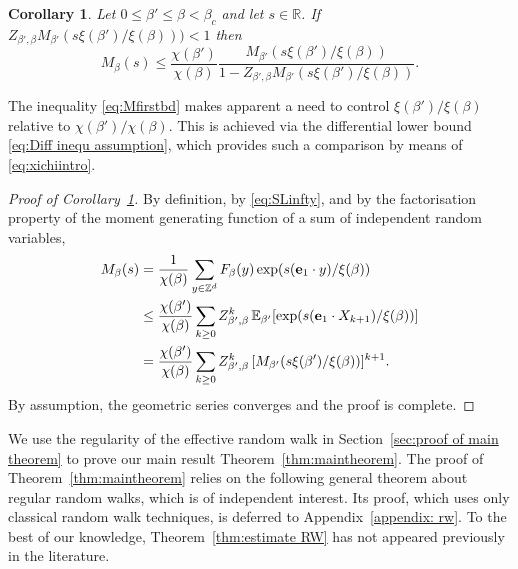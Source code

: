 \documentclass[11pt,a4paper]{article}
\numberwithin{equation}{section}
\theoremstyle{plain}
\newtheorem{Coro}[Thm]{Corollary}
\theoremstyle{definition}
\newcommand\1{\mathds{1}}
\begin{document}
\begin{Coro}
\label{coro:Miteration}
Let $0\leq \beta'\leq \beta<\beta_c$ and let $s \in \mathbb R$.
If $Z_{\beta',\beta}M_{\beta'}(s\xi(\beta')/\xi(\beta))) < 1$
then
\begin{equation}
\label{eq:Mfirstbd}
    M_\beta(s)
    \le
    \frac{\chi(\beta')}{\chi(\beta)}
    \frac{M_{\beta'}(s\xi(\beta')/\xi(\beta))}{1-Z_{\beta',\beta}M_{\beta'}(s\xi(\beta')/\xi(\beta))}
    .
\end{equation}
\end{Coro}



The inequality \eqref{eq:Mfirstbd} makes apparent a need to control $\xi(\beta')/\xi(\beta)$ relative to $\chi(\beta')/\chi(\beta)$. This is achieved via the differential lower bound \eqref{eq:Diff inequ assumption}, which provides such a comparison by means of \eqref{eq:xichiintro}.



\begin{proof}[Proof of Corollary~\textup{\ref{coro:Miteration}}] By definition, by \eqref{eq:SLinfty}, and by the factorisation property
of the moment generating function of a sum of independent random variables,
\begin{align}
    M_{\beta}(s)
	&
    = \frac{1}{\chi(\beta)}
    \sum_{y\in \mathbb Z^d}F_{\beta}(y)\exp(s(\mathbf{e}_1\cdot y)/\xi(\beta) )
	\nonumber \\&
\leq \frac{\chi(\beta')}{\chi(\beta)}
\sum_{k\ge0}Z_{\beta',\beta}^k\, \mathbb E_{\beta'}[\exp(s({\bf e}_1\cdot X_{k+1})/\xi(\beta))]
    \nonumber \\
    & =\frac{\chi(\beta')}{\chi(\beta)}
    \sum_{k\ge0}Z_{\beta',\beta}^k\,
    [M_{\beta'}(s\xi(\beta')/\xi(\beta))]^{k+1}
	.
\label{eq:Miteration}
\end{align}
By assumption, the geometric series converges and the proof is complete.
\end{proof}

We use the regularity of the effective random walk
in Section~\ref{sec:proof of main theorem} to prove
our main result Theorem~\ref{thm:maintheorem}. The proof of Theorem~\ref{thm:maintheorem} relies on
the following general theorem about regular random walks, which
is of independent interest.
Its proof, which uses only classical random walk techniques,
is deferred to Appendix~\ref{appendix: rw}.
To the best of our knowledge,
Theorem~\ref{thm:estimate RW} has not appeared previously in the
literature.
\end{document}
